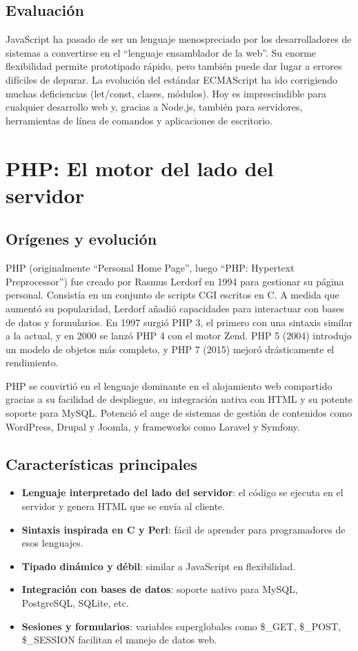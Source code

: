 \subsection{Evaluación}

JavaScript ha pasado de ser un lenguaje menospreciado por los desarrolladores de sistemas a convertirse en el ``lenguaje ensamblador de la web''. Su enorme flexibilidad permite prototipado rápido, pero también puede dar lugar a errores difíciles de depurar. La evolución del estándar ECMAScript ha ido corrigiendo muchas deficiencias (let/const, clases, módulos). Hoy es imprescindible para cualquier desarrollo web y, gracias a Node.js, también para servidores, herramientas de línea de comandos y aplicaciones de escritorio.

\section{PHP: El motor del lado del servidor}

\subsection{Orígenes y evolución}

PHP (originalmente ``Personal Home Page'', luego ``PHP: Hypertext Preprocessor'') fue creado por Rasmus Lerdorf en 1994 para gestionar su página personal. Consistía en un conjunto de scripts CGI escritos en C. A medida que aumentó su popularidad, Lerdorf añadió capacidades para interactuar con bases de datos y formularios. En 1997 surgió PHP 3, el primero con una sintaxis similar a la actual, y en 2000 se lanzó PHP 4 con el motor Zend. PHP 5 (2004) introdujo un modelo de objetos más completo, y PHP 7 (2015) mejoró drásticamente el rendimiento.

PHP se convirtió en el lenguaje dominante en el alojamiento web compartido gracias a su facilidad de despliegue, su integración nativa con HTML y su potente soporte para MySQL. Potenció el auge de sistemas de gestión de contenidos como WordPress, Drupal y Joomla, y frameworks como Laravel y Symfony.

\subsection{Características principales}

\begin{itemize}
  \item \textbf{Lenguaje interpretado del lado del servidor}: el código se ejecuta en el servidor y genera HTML que se envía al cliente.
  \item \textbf{Sintaxis inspirada en C y Perl}: fácil de aprender para programadores de esos lenguajes.
  \item \textbf{Tipado dinámico y débil}: similar a JavaScript en flexibilidad.
  \item \textbf{Integración con bases de datos}: soporte nativo para MySQL, PostgreSQL, SQLite, etc.
  \item \textbf{Sesiones y formularios}: variables superglobales como \$\_GET, \$\_POST, \$\_SESSION facilitan el manejo de datos web.
\end{itemize}

